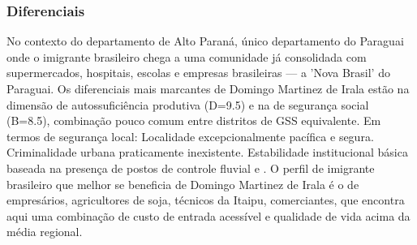 \subsubsection*{Diferenciais}\label{dif-domingo-martinez-de-irala-1003}
No contexto do departamento de Alto Paraná, único departamento do Paraguai onde o imigrante brasileiro chega a uma comunidade já consolidada com supermercados, hospitais, escolas e empresas brasileiras — a 'Nova Brasil' do Paraguai. Os diferenciais mais marcantes de Domingo Martinez de Irala estão na dimensão de autossuficiência produtiva (D=9.5) e na de segurança social (B=8.5), combinação pouco comum entre distritos de GSS equivalente. Em termos de segurança local: Localidade excepcionalmente pacífica e segura. Criminalidade urbana praticamente inexistente. Estabilidade institucional básica baseada na presença de postos de controle fluvial e . O perfil de imigrante brasileiro que melhor se beneficia de Domingo Martinez de Irala é o de empresários, agricultores de soja, técnicos da Itaipu, comerciantes, que encontra aqui uma combinação de custo de entrada acessível e qualidade de vida acima da média regional.
